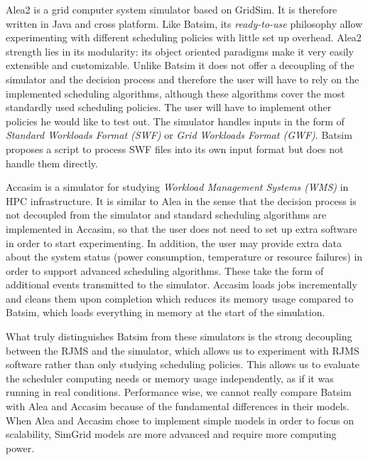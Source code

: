 Alea2\cite{alea2} is a grid computer system simulator based on GridSim. It is
therefore written in Java and cross platform. Like Batsim, its
\textit{ready-to-use} philosophy allow experimenting with different scheduling
policies with little set up overhead.  Alea2 strength lies in its modularity:
its object oriented paradigms make it very easily extensible and customizable.
Unlike Batsim it does not offer a decoupling of the simulator and the decision
process and therefore the user will have to rely on the implemented scheduling
algorithms, although these algorithms cover the most standardly used scheduling
policies.  The user will have to implement other policies he would like to test
out. The simulator handles inputs in the form of \textit{Standard Workloads
Format (SWF)} or \textit{Grid Workloads Format (GWF)}. Batsim proposes a script
to process SWF files into its own input format but does not handle them
directly.

Accasim\cite{10.1007/978-3-319-73353-1_12} is a simulator for studying
\textit{Workload Management Systems (WMS)} in HPC infrastructure. It is similar
to Alea in the sense that the decision process is not decoupled from the
simulator and standard scheduling algorithms are implemented in Accasim, so
that the user does not need to set up extra software in order to start
experimenting. In addition, the user may provide extra data about the system
status (power consumption, temperature or resource failures) in order to
support advanced scheduling algorithms.  These take the form of additional
events transmitted to the simulator. Accasim loads jobs incrementally and
cleans them upon completion which reduces its memory usage compared to Batsim,
which loads everything in memory at the start of the simulation.

What truly distinguishes Batsim from these simulators is the strong decoupling
between the RJMS and the simulator, which allows us to experiment with RJMS
software rather than only studying scheduling policies. This allows us to
evaluate the scheduler computing needs or memory usage independently, as if it
was running in real conditions. Performance wise, we cannot really compare
Batsim with Alea and Accasim because of the fundamental differences in their
models. When Alea and Accasim chose to implement simple models in order to
focus on scalability, SimGrid models are more advanced and require more
computing power.

